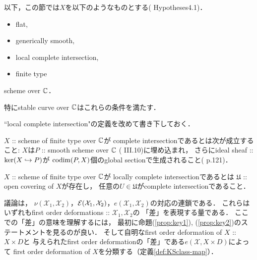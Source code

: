 \documentclass[a4paper]{jsarticle}
\newcommand{\cvU}{\mathfrak{U}}
\newcommand{\defX}{\mathcal{X}}
\begin{document}
    以下，この節では$X$を以下のようなものとする(\cite{DefLCI} Hypotheses4.1)．
    \begin{screen}
    \begin{itemize}
        \item flat,
        \item generically smooth,
        \item local complete intersection,
        \item finite type
    \end{itemize}
        scheme over $\mathbb{C}$．
    \end{screen}
    特にstable curve over $\mathbb{C}$はこれらの条件を満たす．

    ``local complete intersection"の定義を改めて書き下しておく．
    \begin{Def}
        $X$ :: scheme of finite type over $\mathbb{C}$が
        complete intersectionであるとは次が成立すること:
        $X$は$P$ :: smooth scheme over $\mathbb{C}$ (\cite{HarAG} III.10)に埋め込まれ，
        さらにideal sheaf :: $\ker(X \hookrightarrow P)$が
        $\operatorname{codim}(P, X)$個のglobal sectionで生成されること(\cite{HarAG} p.121)．

        $X$ :: scheme of finite type over $\mathbb{C}$が
        locally complete intersectionであるとは
        $\cvU$ :: open covering of $X$が存在し，
        任意の$U \in \cvU$がcomplete intersectionであること．
    \end{Def}
    
    議論は，
    $\nu(\defX_1, \defX_2)$，$\shE(\defX_1, \defX_2)$，$e(\defX_1, \defX_2)$の対応の連鎖である．
    これらはいずれもfirst order deformations :: $\defX_1, \defX_2$の
    「差」を表現する量である．
    ここでの「差」の意味を理解するには，
    最初に命題(\ref{prop:key1}), (\ref{prop:key2})のステートメントを見るのが良い．
    そして自明なfirst order deformation of $X$ :: $X \times D$と
    与えられたfirst order deformationの「差」である$e(\defX, X \times D)$によって
    first order deformation of $X$を分類する（定義\ref{def:KSclass-map}）．
\end{document}
